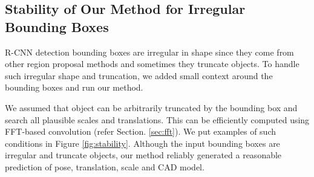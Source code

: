 \documentclass[10pt,twocolumn,letterpaper]{article}
\begin{document}
\subsection{Stability of Our Method for Irregular Bounding Boxes}


R-CNN detection bounding boxes are irregular in shape since they come from other region proposal methods and sometimes they truncate objects. To handle such irregular shape and truncation, we added small context around the bounding boxes and run our method. 

We assumed that object can be arbitrarily truncated by the bounding box and search all plausible scales and translations. This can be efficiently computed using FFT-based convolution (refer Section. \ref{sec:fft}). We put examples of such conditions in Figure \ref{fig:stability}. Although the input bounding boxes are irregular and truncate objects, our method reliably generated a reasonable prediction of pose, translation, scale and CAD model.
\end{document}
